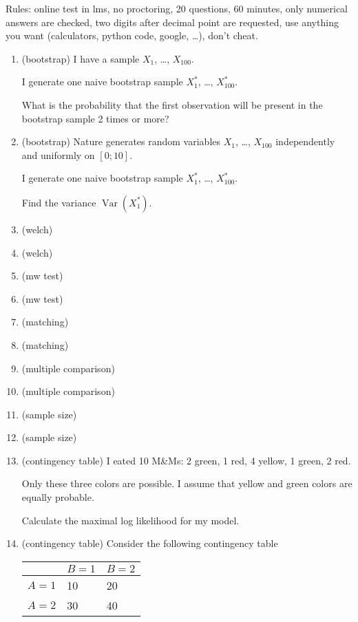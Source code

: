 \documentclass[12pt]{article}
\DeclareMathOperator{\Var}{Var}
\begin{document}
Rules: online test in lms, no proctoring, 20 questions, 60 minutes, only numerical answers are checked, 
two digits after decimal point are requested, 
use anything you want (calculators, python code, google, \ldots), don't cheat. 


\begin{enumerate}
    \item (bootstrap) I have a sample $X_1$, \ldots, $X_{100}$.
    
    I generate one naive bootstrap sample $X_1^*$, \ldots, $X_{100}^*$. 

    What is the probability that the first observation will be present in the bootstrap sample 2 times or more?

    \item (bootstrap) Nature generates random variables $X_1$, \ldots, $X_{100}$ independently and uniformly on $[0;10]$.
    
    I generate one naive bootstrap sample $X_1^*$, \ldots, $X_{100}^*$. 

    Find the variance $\Var(X_1^*)$.
    \item (welch)  
    \item (welch)
    \item (mw test)
    \item (mw test)
    \item (matching)
    \item (matching)
    \item (multiple comparison)
    \item (multiple comparison)
    \item (sample size)
    \item (sample size)
    \item (contingency table) I eated 10 M\&Ms: 2 green, 1 red, 4 yellow, 1 green, 2 red.  
    
    Only these three colors are possible. I assume that yellow and green colors are equally probable.  
    
    Calculate the maximal log likelihood for my model.  
    \item (contingency table) Consider the following contingency table 
    
    \begin{tabular}{@{}lll@{}}
        \toprule
         & $B=1$ & $B=2$ \\ 
         \midrule
         $A=1$ & 10 & 20 \\
         $A=2$ & 30 & 40 \\
        \bottomrule
        \end{tabular}



\end{enumerate}
\end{document}
